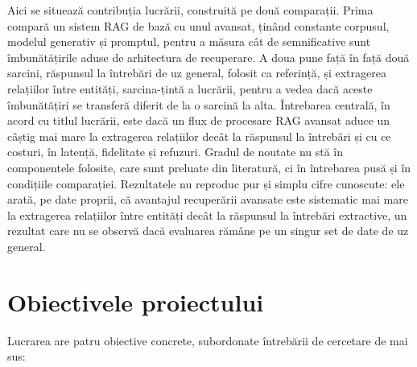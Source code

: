 Aici se situează contribuția lucrării, construită pe două comparații. Prima compară un sistem RAG de bază cu unul avansat, ținând constante corpusul, modelul generativ și promptul, pentru a măsura cât de semnificative sunt îmbunătățirile aduse de arhitectura de recuperare. A doua pune față în față două sarcini, răspunsul la întrebări de uz general, folosit ca referință, și extragerea relațiilor între entități, sarcina-țintă a lucrării, pentru a vedea dacă aceste îmbunătățiri se transferă diferit de la o sarcină la alta. Întrebarea centrală, în acord cu titlul lucrării, este dacă un flux de procesare RAG avansat aduce un câștig mai mare la extragerea relațiilor decât la răspunsul la întrebări și cu ce costuri, în latență, fidelitate și refuzuri. Gradul de noutate nu stă în componentele folosite, care sunt preluate din literatură, ci în întrebarea pusă și în condițiile comparației. Rezultatele nu reproduc pur și simplu cifre cunoscute: ele arată, pe date proprii, că avantajul recuperării avansate este sistematic mai mare la extragerea relațiilor între entități decât la răspunsul la întrebări extractive, un rezultat care nu se observă dacă evaluarea rămâne pe un singur set de date de uz general.

\section*{Obiectivele proiectului}

Lucrarea are patru obiective concrete, subordonate întrebării de cercetare de mai sus:

